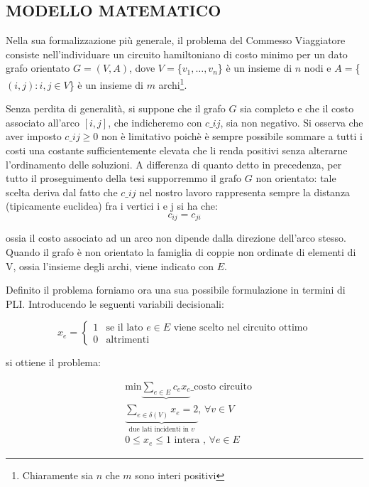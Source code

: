 \documentclass[11pt]{article}
\begin{document}
\subsection*{MODELLO MATEMATICO}
\label{sec:ModelloMatematicoS}

Nella sua formalizzazione più generale, il problema del Commesso Viaggiatore consiste nell'individuare un circuito hamiltoniano di costo minimo per un dato grafo orientato $G=(V,A)$, dove $V = $\{$ {v_1,\dots,v_n} $\}$ $ è un insieme di $n$ nodi e $A = $\{$ {(i,j): i, j \in V} $\}$ $ è un insieme di $m$ archi\footnote{Chiaramente sia $n$ che $m$ sono interi positivi}. 

Senza perdita di generalità, si suppone che il grafo $G$ sia completo e che il costo associato all'arco $[i,j]$, che indicheremo con $c\_{ij}$, sia non negativo. Si osserva che aver imposto $c\_{ij} \ge 0$ non è limitativo poichè è sempre possibile sommare a tutti i costi una costante sufficientemente elevata che li renda positivi senza alterarne l'ordinamento delle soluzioni. 
A differenza di quanto detto in precedenza, per tutto il proseguimento della tesi supporremmo il grafo $G$ non orientato: tale scelta deriva dal fatto che $c\_{ij}$ nel nostro lavoro rappresenta sempre la distanza (tipicamente euclidea) fra i vertici i e j si ha che:
$$c_{ij} = c_{ji}$$

ossia il costo associato ad un arco non dipende dalla direzione dell'arco stesso. Quando il grafo è non orientato la famiglia di coppie non ordinate di elementi di V, ossia l'insieme degli archi, viene indicato con $E$.


Definito il problema forniamo ora una sua possibile formulazione in termini di PLI. Introducendo le seguenti variabili decisionali:

\[
x_{e}=
\begin{cases}
1 & \text{se il lato $e \in E$ viene scelto nel circuito ottimo} \\
0 & \text{altrimenti}
\end{cases}
\]

si ottiene il problema:

\begin{eqnarray}
& \text{min}\displaystyle\underbrace{\sum_{e \in E} c_e x_e}\_{\text{costo circuito}} \\[1.5ex]
&\displaystyle\underbrace{\sum_{e \in \delta(V)} x_e = 2}_{\text{due lati incidenti in }v}\text{,  }\forall v \in V \\[1.5ex]
&0\leq x_e \leq 1 \text{ intera , }\forall e \in E
\end{eqnarray}
\end{document}
